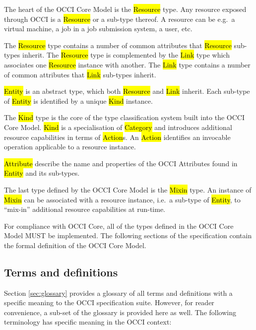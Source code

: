 \documentclass[10pt,a4paper]{article}
\begin{document}
The heart of the OCCI Core Model is the \hl{Resource} type. Any
resource exposed through OCCI is a \hl{Resource} or a sub-type
thereof.  A resource can be e.g.~a virtual machine, a job in a job
submission system, a user, etc.

The \hl{Resource} type contains a number of common attributes that
\hl{Resource} sub-types inherit. The \hl{Resource} type is
complemented by the \hl{Link} type which associates one \hl{Resource}
instance with another.
%
The \hl{Link} type contains a number of common attributes that
\hl{Link} sub-types inherit.

\hl{Entity} is an abstract type, which both \hl{Resource} and \hl{Link}
inherit.  Each sub-type of \hl{Entity} is identified by a unique
\hl{Kind} instance.

The \hl{Kind} type is the core of the type classification system built
into the OCCI Core Model. \hl{Kind} is a specialisation of
\hl{Category} and introduces additional resource capabilities in terms
of \hl{Action}s.  An \hl{Action} identifies an invocable operation
applicable to a resource instance.

\hl{Attribute} describe the name and properties of the OCCI Attributes found in
\hl{Entity} and its sub-types.

The last type defined by the OCCI Core Model is the \hl{Mixin}
type. An instance of \hl{Mixin} can be associated with a resource
instance, i.e.~a sub-type of \hl{Entity}, to ``mix-in'' additional
resource capabilities at run-time.

For compliance with OCCI Core, all of the types defined in the OCCI
Core Model MUST be implemented.  The following sections of the
specification contain the formal definition of the OCCI Core Model.

\subsection{Terms and definitions}
Section \ref{sec:glossary} provides a glossary of all terms and
definitions with a specific meaning to the OCCI specification
suite. However, for reader convenience, a sub-set of the glossary is
provided here as well. The following terminology has specific meaning
in the OCCI context:
\end{document}
